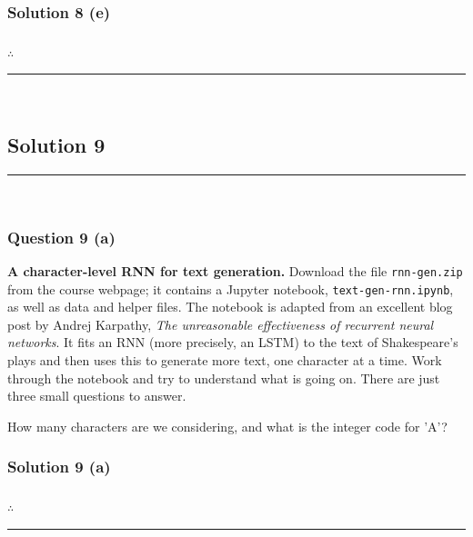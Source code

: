 \documentclass{article}
\begin{document}
\subsubsection*{Solution 8 (e)}


\subsubsection*{\normalfont}{$\therefore$ }

\noindent\rule{\textwidth}{0.4pt}\\

\newpage

\subsection*{Solution 9}
\noindent\rule{\textwidth}{0.4pt}\\
\subsubsection*{Question 9 (a)}
\begin{flushleft}
    \textbf{A character-level RNN for text generation.} Download the file \texttt{rnn-gen.zip} from the course webpage; 
    it contains a Jupyter notebook, \texttt{text-gen-rnn.ipynb}, as well as data and helper files. 
    The notebook is adapted from an excellent blog post by Andrej Karpathy, \textit{The unreasonable effectiveness of recurrent neural networks}. 
    It fits an RNN (more precisely, an LSTM) to the text of Shakespeare's plays and then uses this to generate more text, one character at a time. 
    Work through the notebook and try to understand what is going on. There are just three small questions to answer. 
    
    How many characters are we considering, and what is the integer code for 'A'? 
\end{flushleft}

\subsubsection*{Solution 9 (a)}


\subsubsection*{\normalfont}{$\therefore$ }

\noindent\rule{\textwidth}{0.4pt}\\
\end{document}
